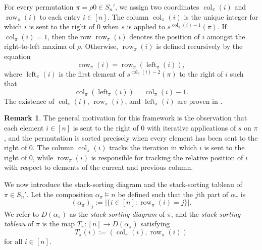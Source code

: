 \documentclass[12pt]{amsart}
\DeclareMathOperator{\col}{col}
\DeclareMathOperator{\leftof}{left}
\DeclareMathOperator{\row}{row}
\theoremstyle{definition}
\newtheorem{remark}[theorem]{Remark}
\begin{document}
For every permutation $\pi=\rho0\in S_n'$, we assign two coordinates $\col_{\pi}(i)$ and $\row_{\pi}(i)$ to each entry $i\in [n]$. The column $\col_{\pi}(i)$ is the unique integer for which $i$ is sent to the right of $0$ when $s$ is applied to $s^{\col_{\pi}(i)-1}(\pi)$. If $\col_{\pi}(i)=1$, then the row $\row_{\pi}(i)$ denotes the position of $i$ amongst the right-to-left maxima of $\rho$. Otherwise, $\row_{\pi}(i)$ is defined recursively by the equation
\[\row_{\pi}(i) = \row_{\pi}(\leftof_{\pi}(i)),\]
where $\leftof_{\pi}(i)$ is the first element of $s^{\col_{\pi}(i)-2}(\pi)$ to the right of $i$ such that \[\col_{\pi}(\leftof_{\pi}(i))=\col_{\pi}(i)-1.\]
The existence of $\col_{\pi}(i)$, $\row_{\pi}(i)$, and $\leftof_{\pi}(i)$ are proven in \cite{zhang26}. 
\begin{remark}
The general motivation for this framework is the observation that each element $i\in[n]$ is sent to the right of $0$ with iterative applications of $s$ on $\pi$, and the permutation is sorted precisely when every element has been sent to the right of $0$. The column $\col_{\pi}(i)$ tracks the iteration in which $i$ is sent to the right of $0$, while $\row_{\pi}(i)$ is responsible for tracking the relative position of $i$ with respect to elements of the current and previous column.
\end{remark}
We now introduce the stack-sorting diagram and the stack-sorting tableau of $\pi\in S_n'$. Let the composition $\alpha_\pi\models n$ be defined such that the $j$th part of $\alpha_{\pi}$ is
\[(\alpha_\pi)_j:=|\{i\in[n]:\row_\pi(i)=j\}|.\]
We refer to $D(\alpha_{\pi})$ as the \emph{stack-sorting diagram} of $\pi$, and the \emph{stack-sorting tableau} of $\pi$ is the map $T_{\pi}:[n]\to D(\alpha_{\pi})$ satisfying
\[T_{\pi}(i) := (\col_{\pi}(i), \row_{\pi}(i))\]
for all $i\in [n]$.
\end{document}

